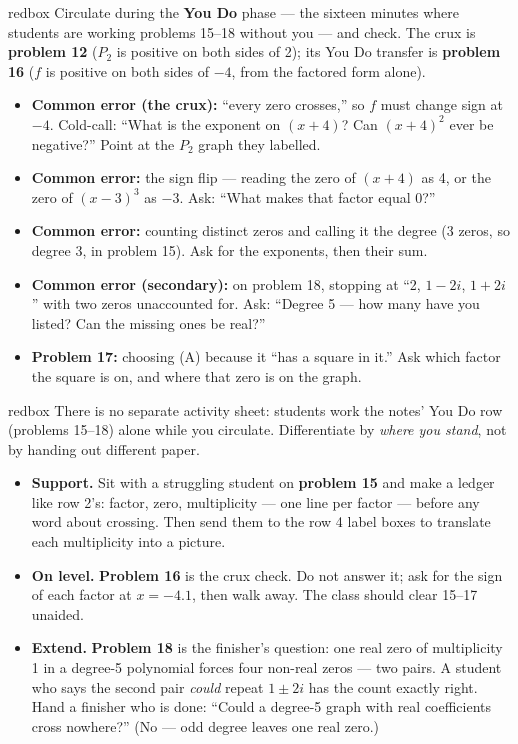 \documentclass[10pt]{article}
\begin{document}
\begin{skillbox}{redbox}
Circulate during the \textbf{You Do} phase --- the sixteen minutes where students are working
problems 15--18 without you --- and check. The crux is \textbf{problem 12} ($P_2$ is positive
on both sides of 2); its You Do transfer is \textbf{problem 16} ($f$ is positive on both sides
of $-4$, from the factored form alone).
\begin{itemize}
  \item \textbf{Common error (the crux):} ``every zero crosses,'' so $f$ must change sign at
        $-4$. Cold-call: ``What is the exponent on $(x + 4)$? Can $(x + 4)^2$ ever be
        negative?'' Point at the $P_2$ graph they labelled.
  \item \textbf{Common error:} the sign flip --- reading the zero of $(x + 4)$ as 4, or the
        zero of $(x - 3)^3$ as $-3$. Ask: ``What makes that factor equal 0?''
  \item \textbf{Common error:} counting distinct zeros and calling it the degree (3 zeros, so
        degree 3, in problem 15). Ask for the exponents, then their sum.
  \item \textbf{Common error (secondary):} on problem 18, stopping at ``2, $1 - 2i$, $1 + 2i$''
        with two zeros unaccounted for. Ask: ``Degree 5 --- how many have you listed? Can the
        missing ones be real?''
  \item \textbf{Problem 17:} choosing (A) because it ``has a square in it.'' Ask which factor the
        square is on, and where that zero is on the graph.
\end{itemize}
\end{skillbox}

\begin{skillbox}{redbox}
There is no separate activity sheet: students work the notes' You Do row (problems 15--18)
alone while you circulate. Differentiate by \textit{where you stand}, not by handing out
different paper.

\begin{itemize}
  \item \textbf{Support.} Sit with a struggling student on \textbf{problem 15} and make a ledger
        like row 2's: factor, zero, multiplicity --- one line per factor --- before any word
        about crossing. Then send them to the row 4 label boxes to translate each
        multiplicity into a picture.
  \item \textbf{On level.} \textbf{Problem 16} is the crux check. Do not answer it; ask for the
        sign of each factor at $x = -4.1$, then walk away. The class should clear 15--17
        unaided.
  \item \textbf{Extend.} \textbf{Problem 18} is the finisher's question: one real zero of
        multiplicity 1 in a degree-5 polynomial forces four non-real zeros --- two pairs. A
        student who says the second pair \emph{could} repeat $1 \pm 2i$ has the count exactly
        right. Hand a finisher who is done: ``Could a degree-5 graph with real coefficients
        cross nowhere?'' (No --- odd degree leaves one real zero.)
\end{itemize}
\end{skillbox}
\end{document}

